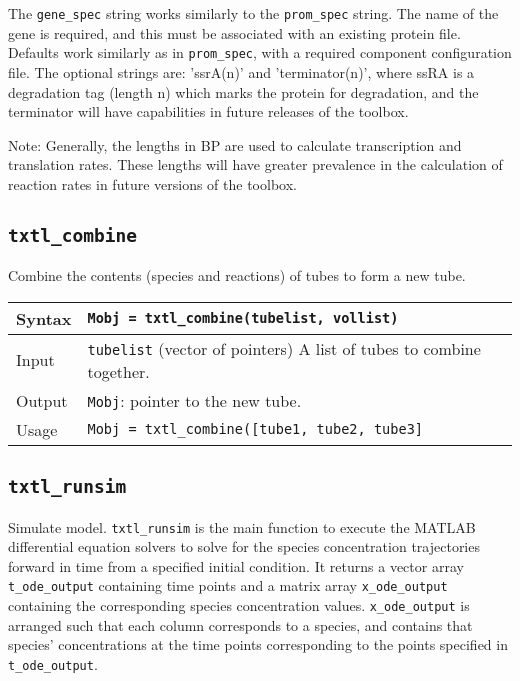 The \texttt{gene\_spec} string works similarly to the \texttt{prom\_spec} string. The name of the gene is required, and this must be associated with an existing protein file. Defaults work similarly as in \texttt{prom\_spec}, with a required component configuration file. The optional strings are: 'ssrA(n)' and 'terminator(n)', where ssRA is a degradation tag (length n) which marks the protein for degradation, and the terminator will have capabilities in future releases of the toolbox. 

Note: Generally, the lengths in BP are used to calculate transcription and translation rates. These lengths will have greater prevalence in the calculation of reaction rates in future versions of the toolbox. 

		\subsection*{\texttt{txtl\_combine}}
				Combine the contents (species and reactions) of tubes to form a new tube. \\	
			
			\begin{tabular}{p{2cm}|p{13cm}}
			Syntax & \texttt{Mobj = txtl\_combine(tubelist, vollist)}\\ \hline
			Input & \texttt{tubelist} (vector of pointers) A list of tubes to combine together. \\ \hline
			Output & \texttt{Mobj}: pointer to the new tube.\\ \hline
			Usage & \texttt{Mobj = txtl\_combine([tube1, tube2, tube3]}\\
			\end{tabular}
				
		\subsection*{\texttt{txtl\_runsim}} 
		
		Simulate model. \texttt{txtl\_runsim} is the main function to execute the MATLAB differential equation solvers to solve for the species concentration trajectories forward in time from a specified initial condition. It returns a vector array \texttt{t\_ode\_output} containing time points and a matrix array \texttt{x\_ode\_output} containing the corresponding species concentration values. \texttt{x\_ode\_output} is arranged such that each column corresponds to a species, and contains that species' concentrations at the time points corresponding to the points specified in \texttt{t\_ode\_output}. \\
		
